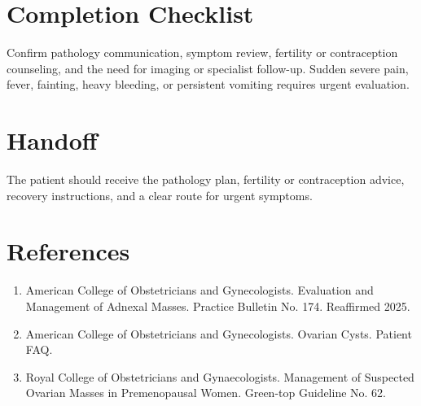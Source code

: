 \section*{Completion Checklist}
Confirm pathology communication, symptom review, fertility or contraception counseling, and the need for imaging or specialist follow-up. Sudden severe pain, fever, fainting, heavy bleeding, or persistent vomiting requires urgent evaluation.

\section*{Handoff}
The patient should receive the pathology plan, fertility or contraception advice, recovery instructions, and a clear route for urgent symptoms.

\section*{References}
\begin{enumerate}
  \item American College of Obstetricians and Gynecologists. Evaluation and Management of Adnexal Masses. Practice Bulletin No. 174. Reaffirmed 2025.
  \item American College of Obstetricians and Gynecologists. Ovarian Cysts. Patient FAQ.
  \item Royal College of Obstetricians and Gynaecologists. Management of Suspected Ovarian Masses in Premenopausal Women. Green-top Guideline No. 62.
\end{enumerate}

\clearpage
